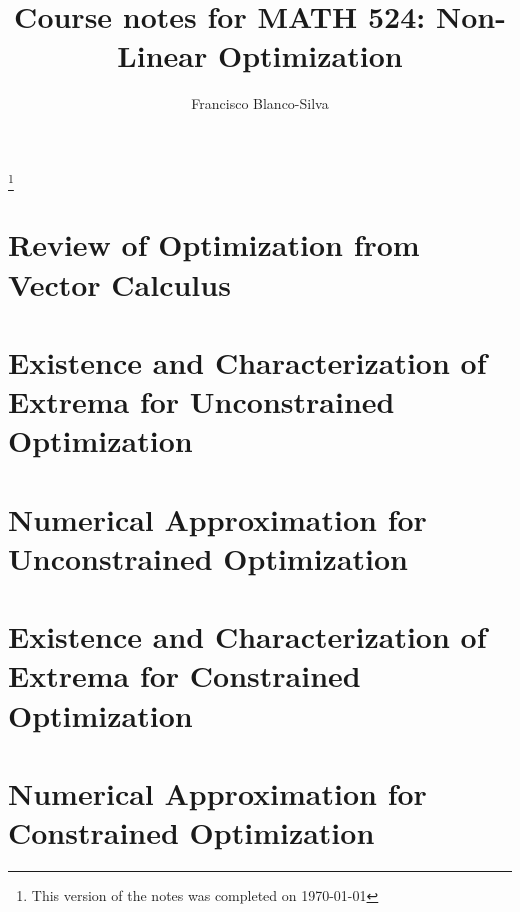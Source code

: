 \documentclass[11pt, reqno]{amsbook}
\begin{document}
\frontmatter
\title[Non-Linear Optimization]{Course notes for MATH 524: Non-Linear Optimization}
\author[F.J.~Blanco-Silva]{Francisco Blanco-Silva}
\address{Department of Mathematics\\ 
University of South Carolina}
\thanks{This version of the notes was completed on \today}
\maketitle
\tableofcontents
\listoffigures

\mainmatter

\chapter{Review of Optimization from Vector Calculus}
\label{chapter:intro}



\chapter[Unconstrained Optimization]{Existence and Characterization of Extrema for Unconstrained Optimization}
\label{chapter:UnconstrainedExistenceCharacterization}



\chapter{Numerical Approximation for Unconstrained Optimization}\label{chapter:UnconstrainedNumerical}







\chapter[Constrained Optimization]{Existence and Characterization of Extrema for Constrained Optimization}
\label{chapter:ConstrainedExistenceCharacterization}





\chapter{Numerical Approximation for Constrained Optimization}
\label{chapter:ConstrainedNumerical}



\printindex


\appendix



\end{document}
